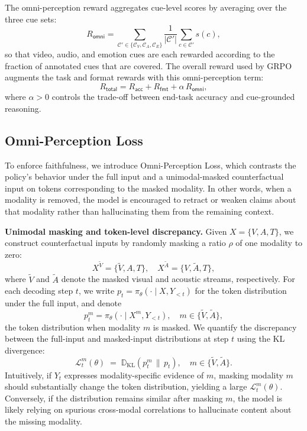 \documentclass{article}
\theoremstyle{plain}
\theoremstyle{definition}
\theoremstyle{remark}
\begin{document}
The omni-perception reward aggregates cue-level scores by averaging over the three cue sets:
\begin{equation}
R_\mathsf{omni}
=\sum_{\mathcal{C}'\in \{\mathcal{C}_V, \mathcal{C}_A, \mathcal{C}_E\}} 
\frac{1}{|\mathcal{C}'|}\sum_{c\in \mathcal{C}'} s(c),
\end{equation}
so that video, audio, and emotion cues are each rewarded according to the fraction of annotated cues that are covered.
The overall reward used by GRPO augments the task and format rewards with this omni-perception term:
\begin{equation}
\label{eq:rtotal}
R_\mathsf{total}
= R_\mathsf{acc} + R_\mathsf{fmt} + \alpha\, R_\mathsf{omni},
\end{equation}
where $\alpha>0$ controls the trade-off between end-task accuracy and cue-grounded reasoning.



\subsection{Omni-Perception Loss}
\label{sec:loss}
To enforce faithfulness, we introduce Omni-Perception Loss, which contrasts the policy’s behavior under the full input and a unimodal-masked counterfactual input on tokens corresponding to the masked modality.  
In other words, when a modality is removed, the model is encouraged to retract or weaken claims about that modality rather than hallucinating them from the remaining context. 

\noindent\textbf{Unimodal masking and token-level discrepancy.}
Given $X=\{V,A,T\}$, we construct  counterfactual inputs by randomly masking a ratio $\rho$ of one modality to zero:
\begin{equation}
    X^{\tilde{V}}=\{\tilde{V},A,T\}, \quad X^{\tilde{A}}=\{V,\tilde{A},T\},
\end{equation}
where $\tilde{V}$ and $\tilde{A}$ denote the masked visual and acoustic streams, respectively.
For each decoding step $t$, we write $p_t = \pi_\theta(\cdot \mid X, Y_{<t})$ for the token distribution under the full input, and denote
\begin{equation}
    p_t^{m} = \pi_\theta(\cdot \mid X^{ m}, Y_{<t}), \quad m \in \{\tilde{V},\tilde{A}\},
\end{equation}
the token distribution when modality $m$ is masked.
We quantify the discrepancy between the full-input and masked-input distributions at step $t$ using the KL divergence:
\begin{equation}
\label{eq:kl_token}
\mathcal{L}_t^{m}(\theta) \;=\; \mathbb{D}_{\mathrm{KL}}\!\left(p_t^{m} \,\|\, p_t\right),\quad 
m \in \{\tilde{V},\tilde{A}\}.
\end{equation}
Intuitively, if $Y_t$ expresses modality-specific evidence of $m$, masking modality $m$ should substantially change the token distribution, yielding a large $\mathcal{L}_t^{m}(\theta)$. Conversely, if the distribution remains similar after masking $m$, the model is likely relying on spurious cross-modal correlations to hallucinate content about the missing modality. 
\end{document}
